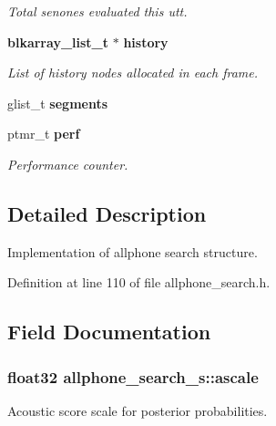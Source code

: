 \begin{DoxyCompactItemize}
\begin{DoxyCompactList}\small\item\em Total senones evaluated this utt. \end{DoxyCompactList}\item 
{\bf blkarray\+\_\+list\+\_\+t} $\ast$ {\bf history}\label{structallphone__search__s_a6f01de182b60ca03ab9fed3bc63fadc5}

\begin{DoxyCompactList}\small\item\em List of history nodes allocated in each frame. \end{DoxyCompactList}\item 
glist\+\_\+t {\bfseries segments}\label{structallphone__search__s_a15739824f77c6f825d5324e826458721}

\item 
ptmr\+\_\+t {\bf perf}\label{structallphone__search__s_ab933d7d82322055b5d0c62e27d7c1f5f}

\begin{DoxyCompactList}\small\item\em Performance counter. \end{DoxyCompactList}\end{DoxyCompactItemize}


\subsection{Detailed Description}
Implementation of allphone search structure. 

Definition at line 110 of file allphone\+\_\+search.\+h.



\subsection{Field Documentation}
\subsubsection[{ascale}]{\setlength{\rightskip}{0pt plus 5cm}float32 allphone\+\_\+search\+\_\+s\+::ascale}\label{structallphone__search__s_a9ad3ecc228af52131028fb91927563dc}


Acoustic score scale for posterior probabilities. 



